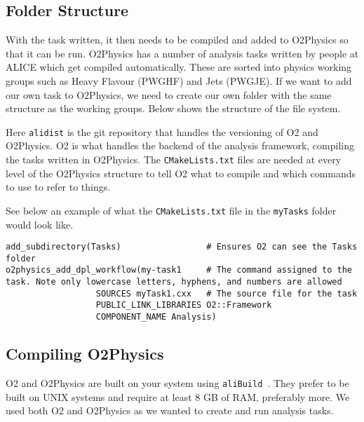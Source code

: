 \subsection{Folder Structure}\label{sec:FolderStructure}
With the task written, it then needs to be compiled and added to O2Physics so that it can be run. O2Physics has a number of analysis tasks written by people at ALICE which get compiled automatically. These are sorted into physics working groups such as Heavy Flavour (PWGHF) and Jets (PWGJE). If we want to add our own task to O2Physics, we need to create our own folder with the same structure as the working groups. Below shows the structure of the file system.

\newpage
{}

Here \texttt{alidist} is the git repository that handles the versioning of O2 and O2Physics. O2 is what handles the backend of the analysis framework, compiling the tasks written in O2Physics. The \texttt{CMakeLists.txt} files are needed at every level of the O2Physics structure to tell O2 what to compile and which commands to use to refer to things. 

See below an example of what the \texttt{CMakeLists.txt} file in the \texttt{myTasks} folder would look like.

\begin{verbatim}
add_subdirectory(Tasks)                 # Ensures O2 can see the Tasks folder
o2physics_add_dpl_workflow(my-task1     # The command assigned to the task. Note only lowercase letters, hyphens, and numbers are allowed
                  SOURCES myTask1.cxx   # The source file for the task
                  PUBLIC_LINK_LIBRARIES O2::Framework
                  COMPONENT_NAME Analysis)
\end{verbatim}

\subsection{Compiling O2Physics}\label{sec:CompileO2Physics}
O2 and O2Physics are built on your system using \texttt{aliBuild}~\cite{aliBuild_install}. They prefer to be built on UNIX systems and require at least 8 GB of RAM, preferably more. We used both O2 and O2Physics as we wanted to create and run analysis tasks. 

